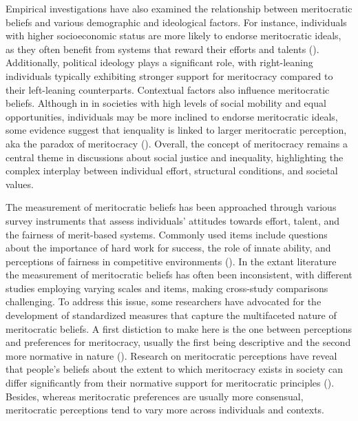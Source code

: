 \documentclass[
  12pt,
]{article}
\begin{document}
Empirical investigations have also examined the relationship between
meritocratic beliefs and various demographic and ideological factors.
For instance, individuals with higher socioeconomic status are more
likely to endorse meritocratic ideals, as they often benefit from
systems that reward their efforts and talents
().
Additionally, political ideology plays a significant role, with
right-leaning individuals typically exhibiting stronger support for
meritocracy compared to their left-leaning counterparts. Contextual
factors also influence meritocratic beliefs. Although in in societies
with high levels of social mobility and equal opportunities, individuals
may be more inclined to endorse meritocratic ideals, some evidence
suggest that ienquality is linked to larger meritocratic perception, aka
the paradox of meritocracy (). Overall, the concept of meritocracy remains a central theme in
discussions about social justice and inequality, highlighting the
complex interplay between individual effort, structural conditions, and
societal values.

The measurement of meritocratic beliefs has been approached through
various survey instruments that assess individuals' attitudes towards
effort, talent, and the fairness of merit-based systems. Commonly used
items include questions about the importance of hard work for success,
the role of innate ability, and perceptions of fairness in competitive
environments (). In the extant literature the measurement of
meritocratic beliefs has often been inconsistent, with different studies
employing varying scales and items, making cross-study comparisons
challenging. To address this issue, some researchers have advocated for
the development of standardized measures that capture the multifaceted
nature of meritocratic beliefs. A first distiction to make here is the
one between perceptions and preferences for meritocracy, usually the
first being descriptive and the second more normative in nature
(). Research on meritocratic perceptions have reveal that
people's beliefs about the extent to which meritocracy exists in society
can differ significantly from their normative support for meritocratic
principles (). Besides, whereas meritocratic preferences are
usually more consensual, meritocratic perceptions tend to vary more
across individuals and contexts.
\end{document}

